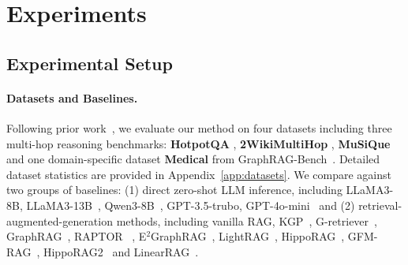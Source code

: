 \section{Experiments}
\label{sec:experiments}


\subsection{Experimental Setup}

\paragraph{Datasets and Baselines.}
Following prior work~\cite{jimenez2024hipporag, zhuang2025linearrag}, we evaluate our method on four datasets including three multi-hop reasoning benchmarks: \textbf{HotpotQA} \cite{yang2018hotpotqa}, \textbf{2WikiMultiHop} \cite{xanh2020_2wikimultihop}, \textbf{MuSiQue} \cite{trivedi2022musique} and one domain-specific dataset \textbf{Medical} from GraphRAG-Bench~\cite{xiang2025use}. Detailed dataset statistics are provided in Appendix~\ref{app:datasets}. We compare \EHGRAG against two groups of baselines: (1) direct zero-shot LLM inference, including LLaMA3-8B, LLaMA3-13B~\cite{dubey2024llama3}, Qwen3-8B~\cite{yang2025qwen3}, GPT-3.5-trubo, GPT-4o-mini~\cite{openai2023gpt4} and (2) retrieval-augmented-generation methods, including vanilla RAG, KGP~\cite{wang2024knowledge}, G-retriever~\cite{he2024g}, GraphRAG~\cite{edge2024local}, RAPTOR ~\cite{sarthi2024raptor}, E$^2$GraphRAG~\cite{zhao20252graphrag}, LightRAG~\cite{guo2024lightrag}, HippoRAG~\cite{jimenez2024hipporag}, GFM-RAG~\cite{luo2025gfm}, HippoRAG2~\cite{gutiérrez2025hipporag2} and LinearRAG~\cite{zhuang2025linearrag}.

